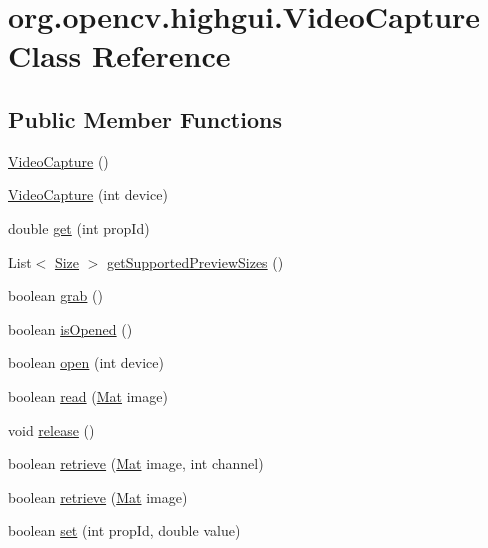 \hypertarget{classorg_1_1opencv_1_1highgui_1_1_video_capture}{}\section{org.\+opencv.\+highgui.\+Video\+Capture Class Reference}
\label{classorg_1_1opencv_1_1highgui_1_1_video_capture}
\subsection*{Public Member Functions}
\begin{DoxyCompactItemize}
\item 
\mbox{\hyperlink{classorg_1_1opencv_1_1highgui_1_1_video_capture_a7c6a4c2222f20a8dee2cdb20eb5dbe55}{Video\+Capture}} ()
\item 
\mbox{\hyperlink{classorg_1_1opencv_1_1highgui_1_1_video_capture_a4f451acfdc7f7abe0959c615b6c6407a}{Video\+Capture}} (int device)
\item 
double \mbox{\hyperlink{classorg_1_1opencv_1_1highgui_1_1_video_capture_ab31e0dd0ba5df72ba518944ae09c1b28}{get}} (int prop\+Id)
\item 
List$<$ \mbox{\hyperlink{classorg_1_1opencv_1_1core_1_1_size}{Size}} $>$ \mbox{\hyperlink{classorg_1_1opencv_1_1highgui_1_1_video_capture_af645d9aa2b7849cfe13664b7b064ab8f}{get\+Supported\+Preview\+Sizes}} ()
\item 
boolean \mbox{\hyperlink{classorg_1_1opencv_1_1highgui_1_1_video_capture_adfd842fc225468ef9ba91b148a551297}{grab}} ()
\item 
boolean \mbox{\hyperlink{classorg_1_1opencv_1_1highgui_1_1_video_capture_a9bb9204765ebe45c6958adad5aaa1319}{is\+Opened}} ()
\item 
boolean \mbox{\hyperlink{classorg_1_1opencv_1_1highgui_1_1_video_capture_ae7887d274bcced3330caa11478da608a}{open}} (int device)
\item 
boolean \mbox{\hyperlink{classorg_1_1opencv_1_1highgui_1_1_video_capture_a33443c8030b858c185c586cf33a91883}{read}} (\mbox{\hyperlink{classorg_1_1opencv_1_1core_1_1_mat}{Mat}} image)
\item 
void \mbox{\hyperlink{classorg_1_1opencv_1_1highgui_1_1_video_capture_a605d177774ab4ad8b92270a9d7682262}{release}} ()
\item 
boolean \mbox{\hyperlink{classorg_1_1opencv_1_1highgui_1_1_video_capture_a222457b750c7be22da0f867e4759c631}{retrieve}} (\mbox{\hyperlink{classorg_1_1opencv_1_1core_1_1_mat}{Mat}} image, int channel)
\item 
boolean \mbox{\hyperlink{classorg_1_1opencv_1_1highgui_1_1_video_capture_a5b76f1b3ed4a3c37249c3e06af9bbeba}{retrieve}} (\mbox{\hyperlink{classorg_1_1opencv_1_1core_1_1_mat}{Mat}} image)
\item 
boolean \mbox{\hyperlink{classorg_1_1opencv_1_1highgui_1_1_video_capture_a49596c3c8d967eb4ab09ad54d9cf2909}{set}} (int prop\+Id, double value)
\end{DoxyCompactItemize}
